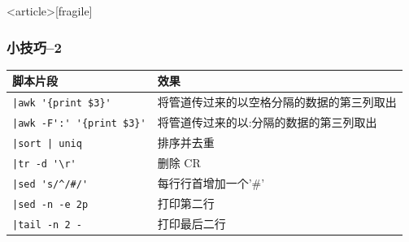 \documentclass[compress]{beamer}
\begin{document}
\begin{frame}<article>[fragile]
    \frametitle{小技巧--2}

    \begin{tabular}{|p{5cm}|p{5cm}|} \hline
脚本片段 & 效果 \\ \hline\hline
\verb~|awk '{print $3}'~ &  将管道传过来的以空格分隔的数据的第三列取出  \\ \hline
\verb~|awk -F':' '{print $3}'~ &  将管道传过来的以:分隔的数据的第三列取出  \\ \hline
\verb~|sort | uniq ~ & 排序并去重 \\ \hline
\verb~|tr -d '\r' ~ & 删除 CR\\ \hline
\verb~|sed 's/^/#/'~ & 每行行首增加一个'\#'\\ \hline
\verb~|sed -n -e 2p~ & 打印第二行\\ \hline
\verb~|tail -n 2 -~ & 打印最后二行\\ \hline
\end{tabular}

\end{frame}
\end{document}
